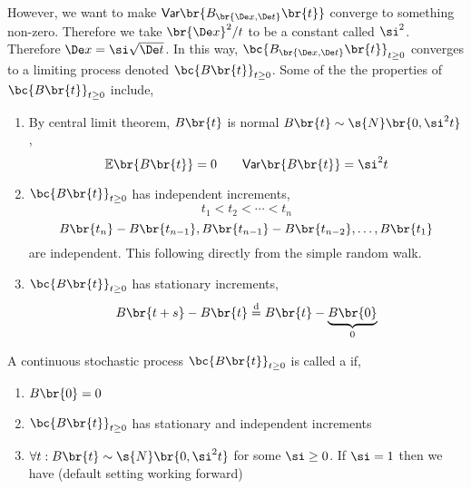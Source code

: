 \documentclass{article}
\newcommand{\Var}{\textsf{Var}}
\newcommand{\Exp}{\mathbb{E}}
\begin{document}
    However, we want to make $\Var\br{B_{\br{\De x, \De t}}\br{t}}$ converge to something non-zero. Therefore we take $\br{\De x}^2 / t$ to be a constant called $\si^2$. Therefore $\De x = \si \sqrt{\De t}$. In this way, $\bc{B_{\br{\De x, \De t}}\br{t}}_{t \geq 0}$ converges to a limiting process denoted $\bc{B\br{t}}_{t \geq 0}$. Some of the the properties of $\bc{B\br{t}}_{t \geq 0}$ include,
    \begin{enumerate}
        \item By central limit theorem, $B\br{t}$ is normal $B\br{t} \sim \s{N}\br{0, \si^2 t}$,
        \[ \Exp\br{B\br{t}} = 0 \qquad \Var\br{B\br{t}} = \si^2 t \]
        \item $\bc{B\br{t}}_{t \geq 0}$ has independent increments,
        \[ t_1 < t_2< \cdots < t_n\]
        \[ B\br{t_n} - B\br{t_{n - 1}}, B\br{t_{n-1}} - B\br{t_{n - 2}}, \ldots, B\br{t_1} \]
        are independent. This following directly from the simple random walk.
        \item $\bc{B\br{t}}_{t\geq0}$ has stationary increments,
        \[ B\br{t + s} - B\br{t} \stackrel{\text{d}}{=} B\br{t} - \underbrace{B\br{0}}_{0} \]
    \end{enumerate}
    \begin{definition}
        A continuous stochastic process $\bc{B\br{t}}_{t \geq 0}$ is called a  if,
        \begin{enumerate}
            \item $B\br{0} = 0$
            \item $\bc{B\br{t}}_{t \geq 0}$ has stationary and independent increments
            \item $\forall t: B\br{t} \sim \s{N}\br{0, \si^2 t}$ for some $\si \geq 0$. If $\si = 1$ then we have  (default setting working forward)
        \end{enumerate}
    \end{definition}
\end{document}
